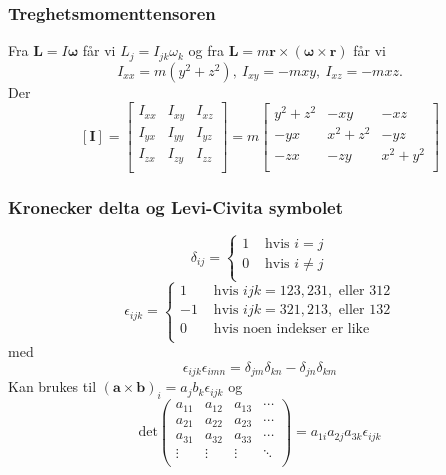 \documentclass[a4paper, norsk, 8pt]{article}
\begin{document}
\begin{multicols*}{2}
\subsubsection*{\small Treghetsmomenttensoren}
Fra $\mathbf{L}=I\mathbf{\omega}$ får vi $L_{j}=I_{jk}\omega_k$ og fra $\mathbf{L}=m\mathbf{r}\times (\mathbf{\omega}\times \mathbf{r})$ får vi 
\[
I_{xx}=m(y^2+z^2), \ I_{xy}=-mxy, \ I_{xz}=-mxz.
\]
Der
\[
[\mathbf{I}]=\left[\begin{matrix}
I_{xx} & I_{xy} & I_{xz} \\
I_{yx} & I_{yy} & I_{yz} \\
I_{zx} & I_{zy} & I_{zz} \\
\end{matrix}\right]
=m\left[\begin{matrix}
y^2+z^2 & -xy & -xz \\
-yx & x^2+z^2 & -yz \\
-zx & -zy & x^2+y^2 \\
\end{matrix}\right]
\]

\subsubsection*{\small Kronecker delta og Levi-Civita symbolet}
\[
\delta_{ij}=\begin{cases}
1 & \mbox{ hvis } i=j \\
0 & \mbox{ hvis } i\neq j \\
\end{cases}\]
\[
\epsilon_{ijk}=\begin{cases}
1 & \mbox{ hvis } ijk=123,231, \mbox{ eller } 312 \\
-1 & \mbox{ hvis } ijk=321,213, \mbox{ eller } 132 \\
0 & \mbox{ hvis noen indekser er like} \\
\end{cases}
\]
med
\[
\epsilon_{ijk}\epsilon_{imn}=\delta_{jm}\delta_{kn}-\delta_{jn}\delta_{km}
\]
Kan brukes til $(\mathbf{a}\times \mathbf{b})_i = a_j b_k \epsilon_{ijk}$ og 
\[
\mbox{det}\left(\begin{matrix}
a_{11} & a_{12} & a_{13} & \cdots \\ 
a_{21} & a_{22} & a_{23} & \cdots \\
a_{31} & a_{32} & a_{33} & \cdots \\
\vdots & \vdots & \vdots & \ddots \\
\end{matrix}\right)=a_{1i}a_{2j}a_{3k}\epsilon_{ijk}
\]


\end{multicols*}
\end{document}
